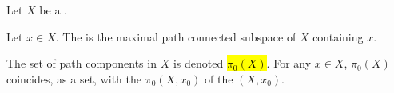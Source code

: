 \begin{definition} \label{definition:path_component_of_a_point_in_a_topological_space}
    Let $X$ be a . 
    
    Let $x \in X$. The  is the maximal path connected subspace of $X$ containing $x$.

    The set of path components in $X$ is denoted \hl{$\pi_0(X)$}. For any $x \in X$, $\pi_0(X)$ coincides, as a set, with the  $\pi_0(X,x_0)$ of the  $(X,x_0)$.
\end{definition}